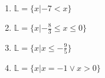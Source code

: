 {\color{solution}
\begin{enumerate}
	\item $\mathbb{L} = \{x | -7< x \}$
	\item $\mathbb{L} = \{x | -\frac{8}{3} \leq x \leq 0 \}$
	\item $\mathbb{L} = \{x | x \leq - \frac{9}{5} \}$
	\item $\mathbb{L} = \{x | x  =-1 \lor x > 0 \}$
\end{enumerate}
}